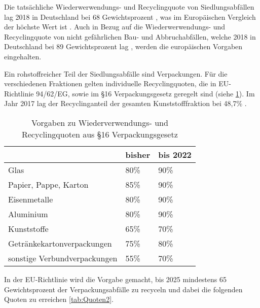 Die tatsächliche Wiederwerwendungs- und Recyclingquote von Siedlungsabfällen lag 2018 in Deutschland bei 68 Gewichtsprozent \cite{DESTATIS2018}, was im Europäischen Vergleich der höchste Wert ist \cite{EUWaste}.
Auch in Bezug auf die Wiederwerwendungs- und Recyclingquote von nicht gefährlichen Bau- und Abbruchabfällen, welche 2018 in Deutschland bei 89 Gewichtsprozent lag \cite{DESTATIS2018}, werden die europäischen Vorgaben eingehalten.

Ein rohstoffreicher Teil der Siedlungsabfälle sind Verpackungen. Für die verschiedenen Fraktionen gelten individuelle Recyclingquoten, die in EU-Richtlinie 94/62/EG, sowie im §16 Verpackungsgesetz \cite{VerpackG2017} geregelt sind (siehe \ref{tab:Quoten1}). Im Jahr 2017 lag der Recyclinganteil der gesamten Kunststofffraktion bei 48,7\% \cite{BMU}. 

\begin{table}[]
	\begin{tabular}{|l|l|l|}
		\hline
		& \textbf{bisher} & \textbf{bis 2022} \\ \hline
		Glas                         & 80\%            & 90\%              \\ \hline
		Papier, Pappe, Karton        & 85\%            & 90\%              \\ \hline
		Eisenmetalle                 & 80\%            & 90\%              \\ \hline
		Aluminium                    & 80\%            & 90\%              \\ \hline
		Kunststoffe                  & 65\%            & 70\%              \\ \hline
		Getränkekartonverpackungen   & 75\%            & 80\%              \\ \hline
		sonstige Verbundverpackungen & 55\%            & 70\%              \\ \hline
	\end{tabular}
	\centering
	\caption{Vorgaben zu Wiederverwendungs- und Recyclingquoten aus §16 Verpackungsgesetz}
	\label{tab:Quoten1}
\end{table}

In der EU-Richtlinie wird die Vorgabe gemacht, bis 2025 mindestens 65 Gewichtsprozent der Verpackungsabfälle zu recyceln und dabei die folgenden Quoten zu erreichen \ref{tab:Quoten2}.


